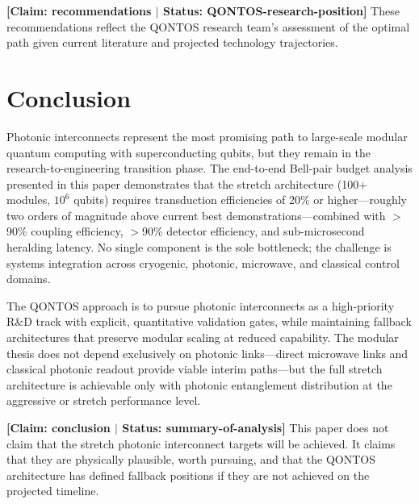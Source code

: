\documentclass[conference]{IEEEtran}
\begin{document}
\textbf{[Claim: recommendations $|$ Status: QONTOS-research-position]} These recommendations reflect the QONTOS research team's assessment of the optimal path given current literature and projected technology trajectories.

\section{Conclusion}

Photonic interconnects represent the most promising path to large-scale modular quantum computing with superconducting qubits, but they remain in the research-to-engineering transition phase. The end-to-end Bell-pair budget analysis presented in this paper demonstrates that the stretch architecture (100+ modules, $10^6$ qubits) requires transduction efficiencies of 20\% or higher---roughly two orders of magnitude above current best demonstrations---combined with $>$90\% coupling efficiency, $>$90\% detector efficiency, and sub-microsecond heralding latency. No single component is the sole bottleneck; the challenge is systems integration across cryogenic, photonic, microwave, and classical control domains.

The QONTOS approach is to pursue photonic interconnects as a high-priority R\&D track with explicit, quantitative validation gates, while maintaining fallback architectures that preserve modular scaling at reduced capability. The modular thesis does not depend exclusively on photonic links---direct microwave links and classical photonic readout provide viable interim paths---but the full stretch architecture is achievable only with photonic entanglement distribution at the aggressive or stretch performance level.

\textbf{[Claim: conclusion $|$ Status: summary-of-analysis]} This paper does not claim that the stretch photonic interconnect targets will be achieved. It claims that they are physically plausible, worth pursuing, and that the QONTOS architecture has defined fallback positions if they are not achieved on the projected timeline.
\end{document}
